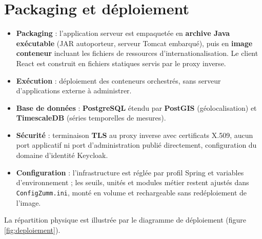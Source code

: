 \section{Packaging et déploiement}
\begin{itemize}
  \item \textbf{Packaging} : l'application serveur est empaquetée en \textbf{archive Java exécutable} (JAR autoporteur, serveur Tomcat embarqué), puis en \textbf{image conteneur} incluant les fichiers de ressources d'internationalisation. Le client React est construit en fichiers statiques servis par le proxy inverse.
  \item \textbf{Exécution} : déploiement des conteneurs orchestrés, sans serveur d'applications externe à administrer.
  \item \textbf{Base de données} : \textbf{PostgreSQL} étendu par \textbf{PostGIS} (géolocalisation) et \textbf{TimescaleDB} (séries temporelles de mesures).
  \item \textbf{Sécurité} : terminaison \textbf{TLS} au proxy inverse avec certificats X.509, aucun port applicatif ni port d'administration publié directement, configuration du domaine d'identité Keycloak.
  \item \textbf{Configuration} : l'infrastructure est réglée par profil Spring et variables d'environnement ; les seuils, unités et modules métier restent ajustés dans \texttt{ConfigZumm.ini}, monté en volume et rechargeable sans redéploiement de l'image.
\end{itemize}
La répartition physique est illustrée par le diagramme de déploiement (figure \ref{fig:deploiement}).
